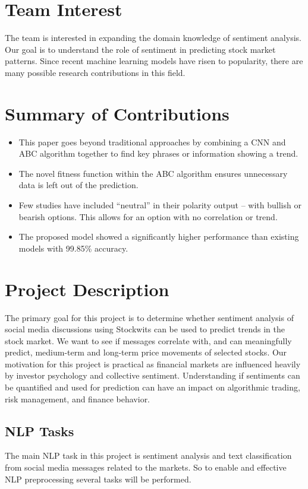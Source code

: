 \documentclass[12pt, onecolumn, letterpaper]{IEEEtran}
\begin{document}
\section{Team Interest}
The team is interested in expanding the domain knowledge of sentiment analysis.
Our goal is to understand the role of sentiment in predicting stock market patterns.
Since recent machine learning models have risen to popularity, there are many possible research contributions in this field.

\section{Summary of Contributions}
\begin{itemize}
    \item This paper goes beyond traditional approaches by combining a CNN and ABC algorithm together to find key phrases or information showing a trend.
    \item The novel fitness function within the ABC algorithm ensures unnecessary data is left out of the prediction.
    \item Few studies have included “neutral” in their polarity output – with bullish or bearish options. This allows for an option with no correlation or trend.
    \item The proposed model showed a significantly higher performance than existing models with 99.85\% accuracy.
\end{itemize}

\section{Project Description}
The primary goal for this project is to determine whether sentiment analysis of social media discussions using Stockwits can be used to predict trends in the stock market.
We want to see if messages correlate with, and can meaningfully predict, medium-term and long-term price movements of selected stocks.
Our motivation for this project is practical as financial markets are influenced heavily by investor psychology and collective sentiment.
Understanding if sentiments can be quantified and used for prediction can have an impact on algorithmic trading, risk management, and finance behavior.

\subsection{NLP Tasks}
The main NLP task in this project is sentiment analysis and text classification from social media messages related to the markets.
So to enable and effective NLP preprocessing several tasks will be performed.
\end{document}
